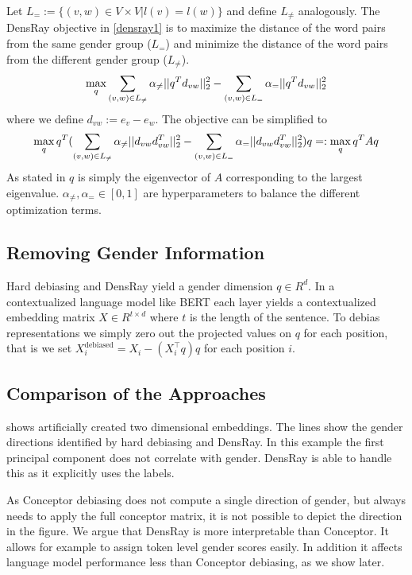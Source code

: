 Let $L_{=}:=\{(v,w)\in V\times V|l(v)=l(w)\}$ and define
$L_{\neq}$ analogously.  The DensRay objective
in \eqref{densray1} is to maximize the distance of the word
pairs from the same gender group ($L_{=}$) and minimize the
distance of the word pairs from the different gender group
($L_{\neq}$).
\begin{eqnarray}
\max\limits_{q} 
\sum_{(v,w)\in L_{\neq}}\alpha_{\neq}||q^Td_{vw}||^2_2
-\sum_{(v,w)\in L_{=}}\alpha_{=}||q^Td_{vw}||^2_2
\eqlabel{densray1}
\end{eqnarray}
where we define $d_{vw}:=e_v-e_w$. The objective can be simplified to 
\begin{eqnarray}
\max \limits_{q} q^T(
\sum_{(v,w)\in L_{\neq}}\alpha_{\neq}||d_{vw}d_{vw}^T||^2_2-\sum_{(v,w)\in L_{=}}\alpha_{=}||d_{vw}d_{vw}^T||^2_2)q=:\max\limits_{q} q^TAq
\eqlabel{eq:densray2}
\end{eqnarray}
As stated in \cite{dufter2019analytical} $q$ is simply the eigenvector of $A$ corresponding to the largest eigenvalue.
$\alpha_{\neq},\alpha_{=}\in [0,1]$ are hyperparameters to balance the different optimization terms.

\subsection{Removing Gender Information}

Hard debiasing and DensRay yield a gender dimension $q \in R^d$. In a contextualized language model like BERT each layer yields a contextualized embedding matrix $X \in R^{t \times d}$ where $t$ is the length of the sentence. To debias representations we simply zero out the projected values on $q$ for each position, that is we set $X^{\text{debiased}}_i = X_i -  (X_i^\intercal q) q$ for each position $i$.


\subsection{Comparison of the Approaches}
  shows artificially created two dimensional embeddings. The lines show the gender directions identified by hard debiasing and DensRay. In this example
 the first principal component does not correlate with gender. DensRay is able to handle this as it explicitly uses the labels.
 
As Conceptor debiasing does not compute a single direction of gender, but always needs to apply the full conceptor matrix, it is not possible to depict the direction in the figure. 
We argue that DensRay is more interpretable than Conceptor. It allows for example to assign token level gender scores easily. In addition it affects language model performance less than Conceptor debiasing, as we show later.
 
